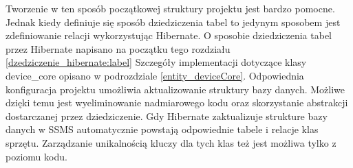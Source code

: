 Tworzenie w ten sposób początkowej struktury projektu jest bardzo pomocne. Jednak kiedy definiuje się sposób dziedziczenia tabel to jedynym sposobem jest zdefiniowanie relacji wykorzystując Hibernate. O sposobie dziedziczenia tabel przez Hibernate napisano na początku tego rozdziału \ref{dzedziczenie_hibernate:label} Szczegóły implementacji dotyczące klasy device\_core opisano w podrozdziale \ref{entity_deviceCore}. Odpowiednia konfiguracja projektu umożliwia aktualizowanie struktury bazy danych. Możliwe dzięki temu jest wyeliminowanie nadmiarowego kodu oraz skorzystanie abstrakcji dostarczanej przez dziedziczenie. Gdy Hibernate zaktualizuje strukture bazy danych w SSMS automatycznie powstają odpowiednie tabele i relacje klas sprzętu. Zarządzanie unikalnością kluczy dla tych klas też jest możliwa tylko z poziomu kodu.
 

